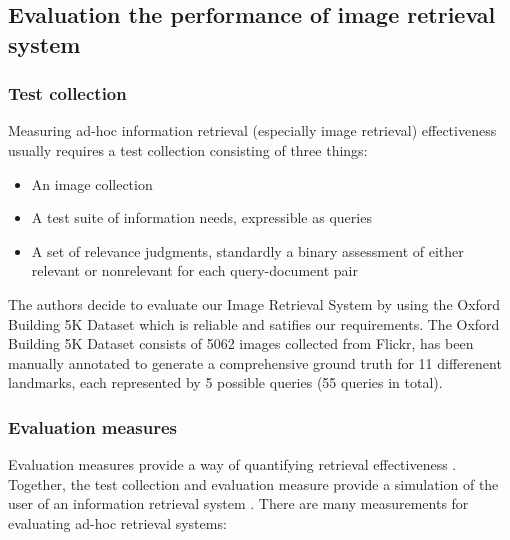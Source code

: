 \documentclass[10pt,conference,]{IEEEtran}
\begin{document}
\subsection{Evaluation the performance of image retrieval system} \label{section:evaluation_ir_sys}

\subsubsection{Test collection}
Measuring ad-hoc information retrieval (especially image retrieval) effectiveness usually requires a test collection consisting of three things:

\begin{itemize} \label{section:evaluation_ir_require}
\item{An image collection}
\item{A test suite of information needs, expressible as queries}
\item{A set of relevance judgments, standardly a binary assessment of either relevant or nonrelevant for each query-document pair}
\end{itemize}

The authors decide to evaluate our Image Retrieval System by using the Oxford Building 5K Dataset which is reliable and satifies our requirements. The Oxford Building 5K Dataset consists of 5062 images collected from Flickr, has been manually annotated to generate a comprehensive ground truth for 11 differenent landmarks, each represented by 5 possible queries (55 queries in total).

\subsubsection{Evaluation measures}
Evaluation measures provide a way of quantifying retrieval effectiveness \cite{c2008, Croft:2009:SEI:1516224}. Together, the test collection and evaluation measure provide a simulation of the user of an information retrieval system \cite{journals/ires/CloughS13}. There are many measurements for evaluating ad-hoc retrieval systems:
\end{document}
